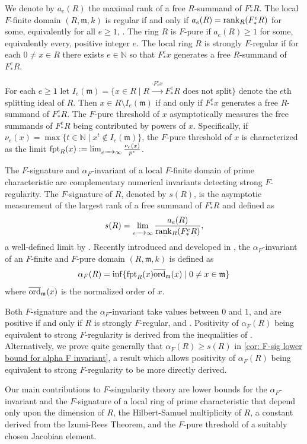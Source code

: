 \documentclass[12pt]{amsart}
\numberwithin{equation}{theorem}
\theoremstyle{plain}
\newcommand{\fm}{\mathfrak{m}}
\newcommand{\NN}{\mathbb{N}}
\begin{document}
We denote by $a_e(R)$ the maximal rank of a free $R$-summand of $F^e_*R$. The local $F$-finite domain $(R,\fm,k)$ is regular if and only if $a_e(R) = \operatorname{{rank}}_R(F^e_*R)$ for some, equivalently for all $e\geq 1$, \cite{Kunz69}. The ring $R$ is $F$-pure if $a_e(R)\geq 1$ for some, equivalently every, positive integer $e$. The local ring $R$ is strongly $F$-regular if for each $0\not=x\in R$ there exists $e\in\NN$ so that $F^e_*x$ generates a free $R$-summand of $F^e_*R$.

For each $e\geq 1$ let $I_e(\fm) = \{x\in R\mid R\xrightarrow{\cdot F^e_*x}F^e_*R\mbox{ does not split}\}$ denote the $e$th splitting ideal of $R$. Then $x\in R\setminus I_e(\fm)$ if and only if $F^e_*x$ generates a free $R$-summand of $F^e_*R$. The $F$-pure threshold of $x$ asymptotically measures the free summands of $F^e_*R$ being contributed by powers of $x$. Specifically, if $\nu_e(x) = \max\{t\in\NN\mid x^t\not\in I_e(\fm)\}$, the $F$-pure threshold of $x$ is characterized as the limit $\operatorname{{fpt}}_R(x):= \lim_{e\xrightarrow{\ \ } \infty} \frac{\nu_e(x)}{p^e}$. 


The $F$-signature and $\alpha_F$-invariant of a local $F$-finite domain of prime characteristic are complementary numerical invariants detecting strong $F$-regularity. The $F$-signature of $R$, denoted by $s(R)$, is the asymptotic measurement of the largest rank of a free summand of $F^e_*R$ and defined as
\[
s(R) = \lim_{e\xrightarrow{\ \ } \infty}\frac{a_e(R)}{\operatorname{{rank}}_R(F^e_*R)},
\]
a well-defined limit by \cite{Tucker12}. Recently introduced and developed in \cite{Pande23,TY26}, the $\alpha_F$-invariant of an $F$-finite and $F$-pure domain $(R,\fm,k)$ is defined as
\[
\alpha_F(R) = \inf\{\fpt_R(x)\overline{\ord}_{\fm}(x)\mid 0\not=x\in \fm\} 
\]
where $\overline{\ord}_{\fm}(x)$ is the normalized order of $x$.

Both $F$-signature and the $\alpha_F$-invariant take values between $0$ and $1$, and are positive if and only if $R$ is strongly $F$-regular, \cite[Main Result]{AL03} and \cite[Proposition~3.9 and Remark~3.11]{TY26}. Positivity of $\alpha_F(R)$ being equivalent to strong $F$-regularity is derived from the inequalities of \cite[Proposition~3.9]{TY26}. Alternatively, we prove quite generally that $\alpha_F(R)\geq s(R)$ in \cref{cor: F-sig lower bound for alpha F invariant}, a result which allows positivity of $\alpha_F(R)$ being equivalent to strong $F$-regularity to be more directly derived.

Our main contributions to $F$-singularity theory are lower bounds for the $\alpha_F$-invariant and the $F$-signature of a local ring of prime characteristic that depend only upon the dimension of $R$, the Hilbert-Samuel multiplicity of $R$, a constant derived from the Izumi-Rees Theorem, and the $F$-pure threshold of a suitably chosen Jacobian element.
\end{document}
